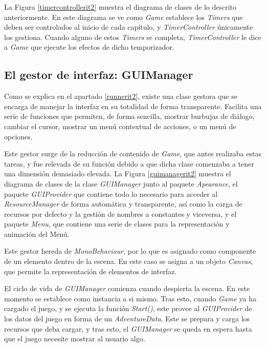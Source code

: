 La Figura \ref{timercontrollerit2} muestra el diagrama de clases de lo descrito anteriormente. En este diagrama se ve como \textit{Game} establece los \textit{Timers} que deben ser controlados al inicio de cada capítulo, y \textit{TimerController} únicamente los gestiona. Cuando alguno de estos \textit{Timers} se completa, \textit{TimerController} le dice a \textit{Game} que ejecute los efectos de dicho temporizador.

\newpage

\subsection{El gestor de interfaz: GUIManager}
\label{guimanagersectionit2}

Como se explica en el apartado \ref{runnerit2}, existe una clase gestora que se encarga de manejar la interfaz en su totalidad de forma transparente. Facilita una serie de funciones que permiten, de forma sencilla, mostrar burbujas de diálogo, cambiar el cursor, mostrar un menú contextual de acciones, o un menú de opciones.

Este gestor surge de la reducción de contenido de \textit{Game}, que antes realizaba estas tareas, y fue relevada de su función debido a que dicha clase comenzaba a tener una dimensión demasiado elevada. La Figura \ref{guimanagerit2} muestra el diagrama de clases de la clase \textit{GUIManager} junto al paquete \textit{Apearance}, el paquete \textit{GUIProvider} que contiene todo lo necesario para acceder al \textit{ResourceManager} de forma automática y transparente, así como la carga de recursos por defecto y la gestión de nombres a constantes y viceversa, y el paquete \textit{Menu}, que contiene una serie de clases para la representación y animación del Menú.

Este gestor hereda de \textit{MonoBehaviour}, por lo que es asignado como componente de un elemento dentro de la escena. En este caso se asigna a un objeto \textit{Canvas}, que permite la representación de elementos de interfaz. 

El ciclo de vida de \textit{GUIManager} comienza cuando despierta la escena. En este momento se establece como instancia a si mismo. Tras esto, cuando \textit{Game} ya ha cargado el juego, y se ejecuta la función \textit{Start()}, este provee al \textit{GUIProvider} de los datos del juego en forma de un \textit{AdventureData}. Este se prepara y carga los recursos que deba cargar, y tras esto, el \textit{GUIManager} se queda en espera hasta que el juego necesite mostrar al usuario algo.

